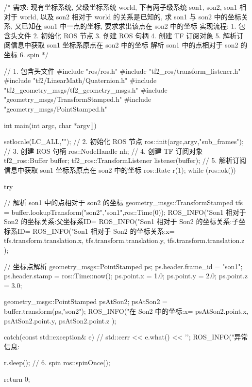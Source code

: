 \documentclass[openany, fontset=windowsold]{ctexbook}
\theoremstyle{kaiti}
\theoremstyle{normal}
\begin{document}
\begin{cpp}
  /*
  需求:
      现有坐标系统, 父级坐标系统 world, 下有两子级系统 son1, son2, 
      son1 相对于 world, 以及 son2 相对于 world 的关系是已知的, 
      求 son1 与 son2 中的坐标关系, 又已知在 son1 中一点的坐标, 要求求出该点在 son2 中的坐标
  实现流程:
      1. 包含头文件
      2. 初始化 ROS 节点
      3. 创建 ROS 句柄
      4. 创建 TF 订阅对象
      5. 解析订阅信息中获取 son1 坐标系原点在 son2 中的坐标
        解析 son1 中的点相对于 son2 的坐标
      6. spin
  */

  // 1. 包含头文件
  #include "ros/ros.h"
  #include "tf2_ros/transform_listener.h"
  #include "tf2/LinearMath/Quaternion.h"
  #include "tf2_geometry_msgs/tf2_geometry_msgs.h"
  #include "geometry_msgs/TransformStamped.h"
  #include "geometry_msgs/PointStamped.h"

  int main(int argc, char *argv[])
  {   setlocale(LC_ALL,"");
      // 2. 初始化 ROS 节点
      ros::init(argc,argv,"sub_frames");
      // 3. 创建 ROS 句柄
      ros::NodeHandle nh;
      // 4. 创建 TF 订阅对象
      tf2_ros::Buffer buffer; 
      tf2_ros::TransformListener listener(buffer);
      // 5. 解析订阅信息中获取 son1 坐标系原点在 son2 中的坐标
      ros::Rate r(1);
      while (ros::ok())
      {
          try
          {
          //   解析 son1 中的点相对于 son2 的坐标
              geometry_msgs::TransformStamped tfs = buffer.lookupTransform("son2","son1",ros::Time(0));
              ROS_INFO("Son1 相对于 Son2 的坐标关系:父坐标系ID=%
              ROS_INFO("Son1 相对于 Son2 的坐标关系:子坐标系ID=%
              ROS_INFO("Son1 相对于 Son2 的坐标关系:x=%
                      tfs.transform.translation.x,
                      tfs.transform.translation.y,
                      tfs.transform.translation.z
                      );

              // 坐标点解析
              geometry_msgs::PointStamped ps;
              ps.header.frame_id = "son1";
              ps.header.stamp = ros::Time::now();
              ps.point.x = 1.0;
              ps.point.y = 2.0;
              ps.point.z = 3.0;

              geometry_msgs::PointStamped psAtSon2;
              psAtSon2 = buffer.transform(ps,"son2");
              ROS_INFO("在 Son2 中的坐标:x=%
                      psAtSon2.point.x,
                      psAtSon2.point.y,
                      psAtSon2.point.z
                      );
          }
          catch(const std::exception& e)
          {
              // std::cerr << e.what() << '\n';
              ROS_INFO("异常信息:%
          }

          r.sleep();
          // 6. spin
          ros::spinOnce();
      }
      return 0;
  }
\end{cpp}
\end{document}
